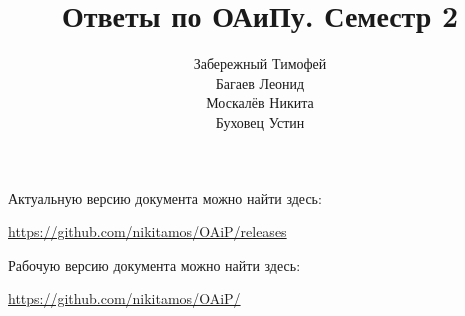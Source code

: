 \documentclass[12pt, a4paper]{extarticle}
\author{
  Забережный Тимофей \\
  Багаев     Леонид  \\
  Москалёв   Никита  \\
  Буховец    Устин   \\
}
\title{Ответы по ОАиПу. Семестр 2}
\begin{document}
\clearpage\maketitle
\thispagestyle{empty}

\vfill

\begin{center}
  Актуальную версию документа можно найти здесь:

  \url{https://github.com/nikitamos/OAiP/releases}

  \vspace{5mm}
  Рабочую версию документа можно найти здесь:

  \url{https://github.com/nikitamos/OAiP/}
\end{center}



\normalsize
\newpage
\tableofcontents
\newpage


\end{document}
